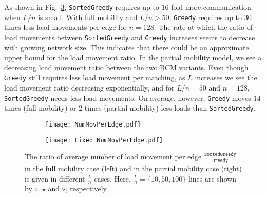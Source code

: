 \documentclass[12pt,psfig,a4]{article}
\newcommand{\sg}{\texttt{SortedGreedy}}
\newcommand{\gr}{\texttt{Greedy}}
\theoremstyle{plain}
\begin{document}
As shown in Fig.~\ref{fig:movePerEdge}, \sg{} requires up to 16-fold more communication when $L/n$ is small. With full mobility and $L/n>50$, \gr{} requires up to 30 times less load movements per edge for $n=128$. The rate at which the ratio of load movements between \sg{} and \gr{} increases seems to decrease with growing network size. This indicates that there could be an approximate upper bound for the load movement ratio. In the partial mobility model, we see a decreasing load movement ratio between the two BCM variants. Even though \gr{} still requires less load movement per matching, as $L$ increases we see the load movement ratio decreasing exponentially, and for $L/n=50$ and $n=128$, \sg{} needs less load movements. On average, however, \gr{} moves 14 times (full mobility) or 2 times (partial mobility) less loads than \sg{}.


\begin{figure}
\centering	
	\begin{subfigure}[b]{0.45\textwidth}	
		\centering
	      	\texttt{[image: NumMovPerEdge.pdf]}
\label{fig:NumMovPerEdge}
	\end{subfigure}
	\begin{subfigure}[b]{0.45\textwidth}	
		\centering
	      	\texttt{[image: Fixed\_NumMovPerEdge.pdf]}
\label{fig:Fixed_NumMovPerEdge}
	\end{subfigure}
	\caption{The ratio of average number of load movement per edge $\frac{\sg{}}{  \gr{}}$ in the full mobility case (left) and in the partial mobility case (right) is given in different $\frac{L}{n}$ cases. Here, $\frac{L}{n}=\{10,50,100\}$ lines are shown by $\circ$, $\star$ and $\triangledown$, respectively. } 
	\label{fig:movePerEdge}
\end{figure}
\end{document}

